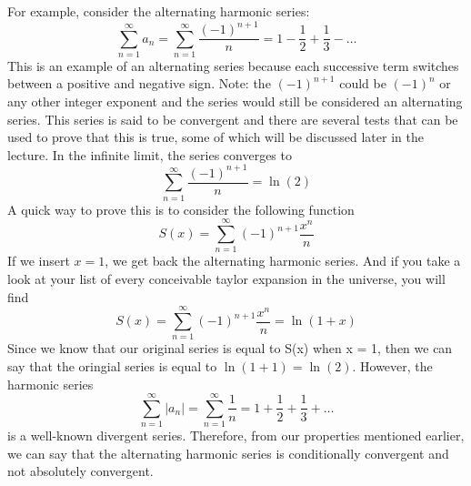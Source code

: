 \documentclass{article}
\newcommand{\be}{\begin{equation}}
\newcommand{\ee}{\end{equation}}
\begin{document}
For example, consider the alternating harmonic series:
\be
\sum_{n=1}^{\infty} a_n = \sum_{n = 1}^{\infty} \frac{(-1)^{n+1}}{n} = 1 - \frac{1}{2} + \frac{1}{3} - \hdots
\ee
This is an example of an alternating series because each successive term switches between a positive and negative sign.
Note: the $(-1)^{n+1}$ could be $(-1)^{n}$ or any other integer exponent and the series would still be considered an alternating series.
This series is said to be convergent and there are several tests that can be used to prove that this is true, some of which will be discussed later in the lecture.
In the infinite limit, the series converges to
\be
\sum_{n = 1}^{\infty} \frac{(-1)^{n+1}}{n} = \ln(2)
\ee
A quick way to prove this is to consider the following function
\be
S(x) = \sum_{n = 1}^{\infty} (-1)^{n+1} \frac{x^n}{n}
\ee
If we insert $x = 1$, we get back the alternating harmonic series.
And if you take a look at your list of every conceivable taylor expansion in the universe, you will find
\be
S(x) = \sum_{n = 1}^{\infty} (-1)^{n+1} \frac{x^n}{n} = \ln(1+x)
\ee
Since we know that our original series is equal to S(x) when x = 1, then we can say that the oringial series is equal to $\ln(1+1) = \ln(2)$.
However, the harmonic series
\be
\sum_{n=1}^{\infty} |a_n| = \sum_{n = 1}^{\infty} \frac{1}{n} = 1 + \frac{1}{2} + \frac{1}{3} + \hdots
\ee
is a well-known divergent series.
Therefore, from our properties mentioned earlier, we can say that the alternating harmonic series is conditionally convergent and not absolutely convergent.
\end{document}
